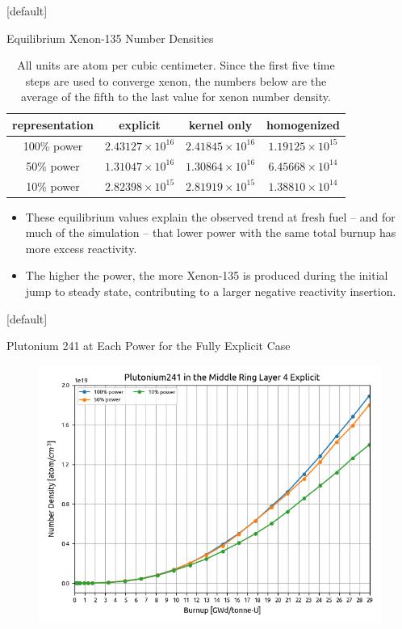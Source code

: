 \documentclass[9pt,t,aspectratio=169]{beamer}
\makeatletter
\newenvironment{withoutheadline}{
       \setbeamertemplate{headline}[default]
       \def\beamer@entrycode{\vspace*{-\headheight}}
    }{}
\makeatother
\begin{document}
\begin{withoutheadline}
\begin{frame}{Equilibrium Xenon-135 Number Densities}
    \LARGE
    \begin{table}
        \centering
        \caption{All units are atom per cubic centimeter. Since the first five time steps are used to converge xenon, the numbers below are the average of the fifth to the last value for xenon number density.}
        \begin{tabular}{|c|c|c|c|} \hline
        representation & explicit & kernel only & homogenized \\ \hline
        100\% power & $2.43127\times 10^{16}$ & $2.41845\times 10^{16}$ & $1.19125\times 10^{15}$ \\  \hline
        50\% power & $1.31047\times 10^{16}$ & $1.30864\times 10^{16}$ & $6.45668\times 10^{14}$ \\ \hline
        10\% power & $2.82398\times 10^{15}$ & $2.81919\times 10^{15}$ & $1.38810\times 10^{14}$ \\ \hline
        \end{tabular}
        \label{tab:xenons}
    \end{table}
    \begin{itemize}
        \item These equilibrium values explain the observed trend at fresh fuel -- and for much of the simulation -- that lower power with the same total burnup has more excess reactivity.
        \item The higher the power, the more Xenon-135 is produced during the initial jump to steady state, contributing to a larger negative reactivity insertion.
    \end{itemize}
\end{frame}
\end{withoutheadline}

\begin{withoutheadline}
\begin{frame}{Plutonium 241 at Each Power for the Fully Explicit Case}
    \begin{figure}
        \vspace*{-0.4cm}
        \centering
            \includegraphics[height=0.9\textheight]{figures/explicit_Pu_241.png}
    \end{figure}
\end{frame}
\end{withoutheadline}
\end{document}
